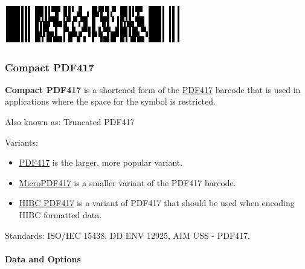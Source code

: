\includegraphics{images/pdf417-5.eps}

\hypertarget{compact-pdf417}{%
\subsubsection{Compact PDF417}\label{compact-pdf417}}

\textbf{Compact PDF417} is a shortened form of the
\protect\hyperlink{pdf417}{PDF417} barcode that is used in applications
where the space for the symbol is restricted.

Also known as: Truncated PDF417

Variants:

\begin{itemize}
\tightlist
\item
  \protect\hyperlink{pdf417}{PDF417} is the larger, more popular
  variant.
\item
  \protect\hyperlink{micropdf417}{MicroPDF417} is a smaller variant of
  the PDF417 barcode.
\item
  \protect\hyperlink{hibc-symbols}{HIBC PDF417} is a variant of PDF417
  that should be used when encoding HIBC formatted data.
\end{itemize}

Standards: ISO/IEC 15438, DD ENV 12925, AIM USS - PDF417.

\hypertarget{data-and-options-15}{%
\paragraph{Data and Options}\label{data-and-options-15}}

